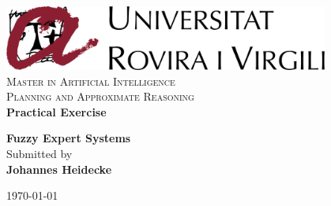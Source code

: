 \begin{titlepage}

\begin{center}


\includegraphics[width=0.8\textwidth]{img/title/urv_smaller}\\[0.1in]
\normalsize
\vspace{1cm}
\textsc{Master in Artificial Intelligence}\\

\vspace{4cm}
\textsc{Planning and Approximate Reasoning} \\
\normalsize \textbf{Practical Exercise}
\vspace{2cm}

\Large \textbf {Fuzzy Expert Systems} \\

\vspace{2.5cm}
\normalsize Submitted by \\
\textbf{Johannes Heidecke} \\ %

\vfill


{\normalsize \today}\\[1cm]
\end{center}

\end{titlepage}